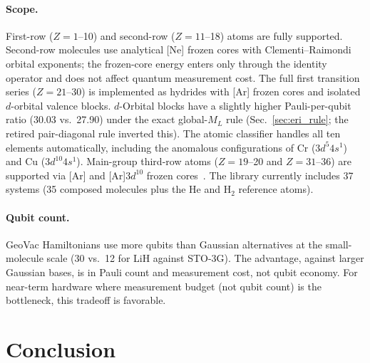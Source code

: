 \documentclass[twocolumn,pra,amsmath,amssymb,superscriptaddress]{revtex4-2}
\begin{document}
\paragraph{Scope.}
First-row ($Z=1$--10) and second-row ($Z=11$--18) atoms are fully
supported.  Second-row molecules use analytical [Ne] frozen cores
with Clementi--Raimondi orbital exponents; the frozen-core energy
enters only through the identity operator and does not affect
quantum measurement cost.
The full first transition series ($Z = 21$--30) is implemented as
hydrides with [Ar] frozen cores and isolated $d$-orbital valence blocks.
$d$-Orbital blocks have a slightly higher Pauli-per-qubit ratio
(30.03 vs.\ 27.90) under the exact global-$M_L$ rule
(Sec.~\ref{sec:eri_rule}; the retired pair-diagonal rule inverted this).
The atomic classifier handles all ten elements automatically,
including the anomalous configurations of Cr ($3d^5 4s^1$) and Cu ($3d^{10} 4s^1$).
Main-group third-row atoms
($Z=19$--20 and $Z=31$--36) are supported via [Ar]
and [Ar]3$d^{10}$ frozen cores~\cite{GeoVac_ScopeBoundary}.
The library currently includes 37 systems (35 composed molecules plus
the He and H$_2$ reference atoms).

\paragraph{Qubit count.}
GeoVac Hamiltonians use more qubits than Gaussian alternatives at the
small-molecule scale (30 vs.\ 12 for LiH against STO-3G).
The advantage, against larger Gaussian bases, is in Pauli count and
measurement cost, not qubit economy.
For near-term hardware where measurement budget (not qubit count) is
the bottleneck, this tradeoff is favorable.

\section{Conclusion}
\label{sec:conclusion}
\end{document}
